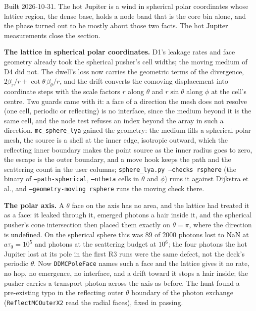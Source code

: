 \documentclass[11pt]{article}
\begin{document}
Built 2026-10-31.  The hot Jupiter is a wind in spherical polar coordinates whose
lattice region, the dense base, holds a node band that is the core bin alone, and the
phase turned out to be mostly about those two facts.  The hot Jupiter measurements
close the section.

\textbf{The lattice in spherical polar coordinates.}  D1's leakage rates and face
geometry already took the spherical pusher's cell widths; the moving medium of D4 did
not.  The dwell's loss now carries the geometric terms of the divergence,
$2\beta_r/r + \cot\theta\,\beta_\theta/r$, and the drift converts the comoving
displacement into coordinate steps with the scale factors $r$ along $\theta$ and
$r\sin\theta$ along $\phi$ at the cell's centre.  Two guards came with it: a face of
a direction the mesh does not resolve (one cell, periodic or reflecting) is no
interface, since the medium beyond it is the same cell, and the node test refuses an
index beyond the array in such a direction.  \texttt{mc\_sphere\_lya} gained the
geometry: the medium fills a spherical polar mesh, the source is a shell at the inner
edge, isotropic outward, which the reflecting inner boundary makes the point source as
the inner radius goes to zero, the escape is the outer boundary, and a move hook keeps
the path and the scattering count in the user columns; \texttt{sphere\_lya.py
--checks rsphere} (the binary of \texttt{--path-spherical}, \texttt{--ntheta} cells
in $\theta$ and $\phi$) runs it against Dijkstra et al., and
\texttt{--geometry-moving rsphere} runs the moving check there.

\textbf{The polar axis.}  A $\theta$ face on the axis has no area, and the lattice
had treated it as a face: it leaked through it, emerged photons a hair inside it, and
the spherical pusher's cone intersection then placed them exactly on $\theta = \pi$,
where the direction is undefined.  On the spherical sphere this was 89 of 2000
photons lost to NaN at $a\tau_0 = 10^5$ and photons at the scattering budget at
$10^6$; the four photons the hot Jupiter lost at its pole in the first R3 runs were
the same defect, not the deck's periodic $\theta$.  Now \texttt{DDMCPoleFace} names
such a face and the lattice gives it no rate, no hop, no emergence, no interface, and
a drift toward it stops a hair inside; the pusher carries a transport photon across
the axis as before.  The hunt found a pre-existing typo in the reflecting outer
$\theta$ boundary of the photon exchange (\texttt{ReflectMCOuterX2} read the radial
faces), fixed in passing.
\end{document}

